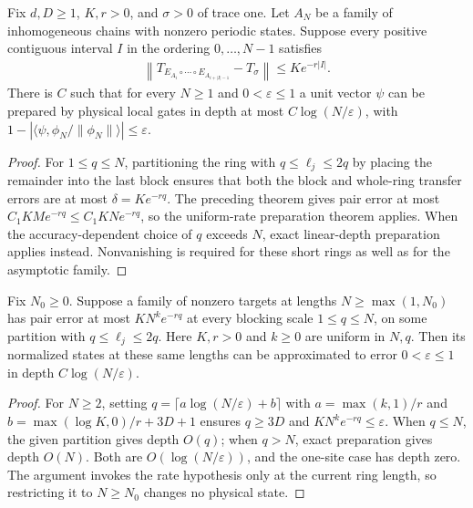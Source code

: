 \begin{lemma}
    \label{thm:ldp_inhomogeneous_ordered_mixing_preparation}
    \leanok
    Fix $d,D\ge1$, $K,r>0$, and $\sigma>0$ of trace one. Let $A_N$ be a
    family of inhomogeneous chains with nonzero periodic states. Suppose
    every positive contiguous interval $I$ in the ordering $0,\ldots,N-1$ satisfies
    \begin{align}
        \left\|T_{E_{A_i}\circ\cdots\circ E_{A_{i+|I|-1}}}
        -T_\sigma\right\|\le K e^{-r|I|}.
    \end{align}
    There is $C$ such that for every $N\ge1$ and $0<\varepsilon\le1$
    a unit vector $\psi$ can be prepared by physical local gates in depth
    at most $C\log(N/\varepsilon)$, with
    $1-|\langle\psi,\phi_N/\|\phi_N\|\rangle|\le\varepsilon$.
\end{lemma}
\begin{proof}\leanok
    For $1\le q\le N$, partitioning the ring with
    $q\le\ell_j\le2q$ by placing the remainder into the last block ensures
    that both the block and whole-ring transfer errors are at most
    $\delta=Ke^{-rq}$. The preceding theorem gives pair error at most
    $C_1KM e^{-rq}\le C_1KN e^{-rq}$, so the uniform-rate preparation
    theorem applies. When the accuracy-dependent choice of $q$ exceeds $N$,
    exact linear-depth preparation applies instead. Nonvanishing is required
    for these short rings as well as for the asymptotic family.
\end{proof}


\begin{lemma}
    \label{thm:ldp_inhomogeneous_uniform_rate_from}
    \leanok
    Fix $N_0\ge0$. Suppose a family of nonzero targets at lengths
    $N\ge\max(1,N_0)$ has pair error at most $KN^ke^{-rq}$ at every
    blocking scale $1\le q\le N$, on some partition with
    $q\le\ell_j\le2q$. Here $K,r>0$ and $k\ge0$ are uniform in $N,q$.
    Then its normalized states at these same lengths can be approximated
    to error $0<\varepsilon\le1$ in depth $C\log(N/\varepsilon)$.
\end{lemma}
\begin{proof}\leanok
    For $N\ge2$, setting $q=\lceil a\log(N/\varepsilon)+b\rceil$ with
    $a=\max(k,1)/r$ and $b=\max(\log K,0)/r+3D+1$ ensures $q\ge3D$ and
    $KN^ke^{-rq}\le\varepsilon$. When $q\le N$, the given partition
    gives depth $O(q)$; when $q>N$, exact preparation gives depth $O(N)$.
    Both are $O(\log(N/\varepsilon))$, and the one-site case has depth zero.
    The argument invokes the rate hypothesis only at the current ring
    length, so restricting it to $N\ge N_0$ changes no physical state.
\end{proof}


